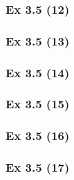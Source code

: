 \subsubsection{Ex 3.5 (12)}\label{sec:Ex_3.5.12}

\subsubsection{Ex 3.5 (13)}\label{sec:Ex_3.5.13}

\subsubsection{Ex 3.5 (14)}\label{sec:Ex_3.5.14}

\subsubsection{Ex 3.5 (15)}\label{sec:Ex_3.5.15}

\subsubsection{Ex 3.5 (16)}\label{sec:Ex_3.5.16}

\subsubsection{Ex 3.5 (17)}\label{sec:Ex_3.5.17}

